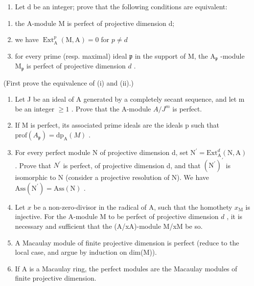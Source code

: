 \begin{enumerate}
\def\labelenumi{\alph{enumi})}
\tightlist
\item
  Let d be an integer; prove that the following conditions are equivalent:
\end{enumerate}

\begin{enumerate}
\def\labelenumi{(\roman{enumi})}
\item
  the A-module M is perfect of projective dimension d;
\item
  we have \(\operatorname{Ext}_{\mathrm{A}}^{p}(\mathrm{M},\mathrm{A}) = 0\) for \(p\neq d\)
\item
  for every prime (resp. maximal) ideal \(\mathfrak{p}\) in the support of M, the \(\mathrm{A}_{\mathfrak{p}}\) -module \(\mathrm{M}_{\mathfrak{p}}\) is perfect of projective dimension \(d\) .
\end{enumerate}

(First prove the equivalence of (i) and (ii).)

\begin{enumerate}
\def\labelenumi{\alph{enumi})}
\setcounter{enumi}{1}
\item
  Let J be an ideal of A generated by a completely secant sequence, and let m be an integer \(\geqslant 1\) . Prove that the A-module \(A/J^{m}\) is perfect.
\item
  If M is perfect, its associated prime ideals are the ideals p such that \(\text{prof}(A_{\mathfrak{p}}) = \text{dp}_{\mathrm{A}}(M)\) .
\item
  For every perfect module N of projective dimension d, set \(\mathrm{N}^{\prime} = \mathrm{Ext}_{\mathrm{A}}^{d}(\mathrm{N}, \mathrm{A})\) . Prove that \(N^{\prime}\) is perfect, of projective dimension d, and that \((\mathrm{N}^{\prime})^{\prime}\) is isomorphic to N (consider a projective resolution of N). We have \(\mathrm{Ass}(\mathrm{N}^{\prime}) = \mathrm{Ass}(\mathrm{N})\) .
\item
  Let \(x\) be a non-zero-divisor in the radical of A, such that the homothety \(x_{\mathrm{M}}\) is injective. For the A-module M to be perfect of projective dimension \(d\) , it is necessary and sufficient that the (A/xA)-module M/xM be so.
\item
  A Macaulay module of finite projective dimension is perfect (reduce to the local case, and argue by induction on dim(M)).
\item
  If A is a Macaulay ring, the perfect modules are the Macaulay modules of finite projective dimension.
\end{enumerate}

